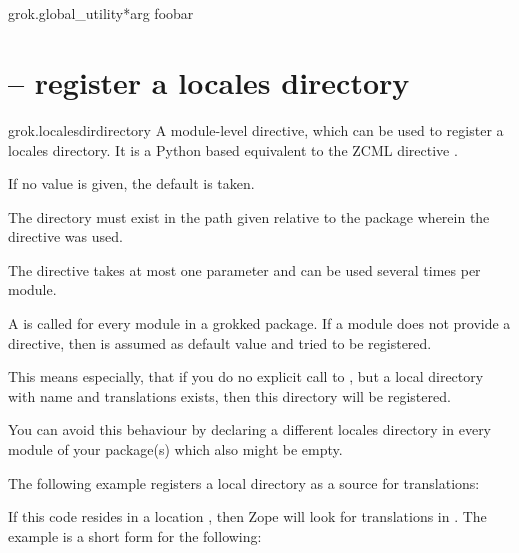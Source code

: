     \section{}

        \begin{funcdesc}{grok.global_utility}{*arg}
        foobar
        \end{funcdesc}

    \section{ -- register a
      locales directory}

        \begin{funcdesc}{grok.localesdir}{directory}
          A module-level directive, which can be used to register
          a locales directory. It is a Python based equivalent to the
          ZCML directive .

          If no value is given, the default  is taken.

          The directory must exist in the path given relative to the
          package wherein the directive was used.

          The directive takes at most one parameter and can be used
          several times per module.

          A  is called for every module in a
          grokked package. If a module does not provide a
           directive, then
           is assumed as default value and tried to be
          registered.

          This means especially, that if you do no explicit call to
          , but a local directory with
          name  and translations exists, then this
          directory will be registered.

          You can avoid this behaviour by declaring a different
          locales directory in every module of your package(s) which
          also might be empty.

          The following example registers a local 
          directory as a source for translations:

          If this code resides in a location , then
          Zope will look for translations in . The
          example is a short form for the following:


\end{funcdesc}
